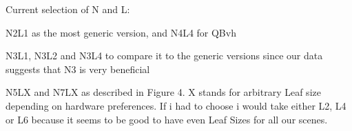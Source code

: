 \documentclass[12pt, a4paper]{report}
\newcommand{\branchf}{Branching Factor}
\newcommand{\leafs}{Leaf Size}
\newcommand{\leafi}{Leaf Intersection}
\newcommand{\nodei}{Node Intersection}
\newcommand{\sleafi}{Shadow Leaf Intersection}
\newcommand{\snodei}{Shadow Node Intersection}
\newcommand{\cost}{Cost Function}
\newcommand{\scost}{Shadow Cost Function}
\newcommand{\sah}{Sah}
\newcommand{\epo}{Epo}
\newcommand{\plotAll} [2]
{
\begin{figure}[!htb]
	\begin{minipage}[t]{0.4\textwidth} 
		\begin{tikzpicture}
		\begin{axis}
		[
		xlabel = \leafs,
		ylabel = \branchf,
		colorbar style={title=\leafi}
		]
		\addplot[matrix plot*,point meta=\thisrow{primaryLeafIntersections}]
		table[x = leafSize, y = branchFactor, col sep=comma]{#1};
		\end{axis}
		\end{tikzpicture}
	\end{minipage}\hfil \hfil
	\begin{minipage}[t]{0.4\textwidth}
		\begin{tikzpicture}
		\begin{axis}
		[
		xlabel = \leafs,
		colorbar style={title=\nodei}
		]
		\addplot[matrix plot*,point meta=\thisrow{primaryNodeIntersections}]
		table[x = leafSize, y = branchFactor, col sep=comma]{#1};
		\end{axis}
		\end{tikzpicture}
	\end{minipage}
	
	\begin{minipage}[t]{0.4\textwidth} 
		\begin{tikzpicture}
		\begin{axis}
		[
		xlabel = \leafs,
		ylabel = \branchf,
		colorbar style={title=\sleafi}
		]
		\addplot[matrix plot*,point meta=\thisrow{secondaryLeafIntersections}]
		table[x = leafSize, y = branchFactor, col sep=comma]{#1};
		\end{axis}
		\end{tikzpicture}
	\end{minipage}\hfil \hfil
	\begin{minipage}[t]{0.4\textwidth}
		\begin{tikzpicture}
		\begin{axis}
		[
		xlabel = \leafs,
		colorbar style={title=\snodei}
		]
		\addplot[matrix plot*,point meta=\thisrow{secondaryNodeIntersections}]
		table[x = leafSize, y = branchFactor, col sep=comma]{#1};
		\end{axis}
		\end{tikzpicture}
	\end{minipage}
	
	\begin{minipage}[t]{0.4\textwidth}
		\begin{tikzpicture}
		\begin{axis}
		[
		xlabel = \leafs,
		ylabel = \branchf,
		colorbar style={title=\cost}
		]
		\addplot[matrix plot*,point meta=\thisrow{PrimaryCost}]
		table[x = leafSize, y = branchFactor, col sep=comma]{#1};
		\end{axis}
		\end{tikzpicture}
	\end{minipage}\hfil\hfil
	\begin{minipage}[t]{0.4\textwidth}
		
		\begin{tikzpicture}
		\begin{axis}
		[
		xlabel = \leafs,
		colorbar style={title=\scost}
		]
		\addplot[matrix plot*,point meta=\thisrow{SecondaryCost}]
		table[x = leafSize, y = branchFactor, col sep=comma]{#1};
		\end{axis}
		\end{tikzpicture}
	\end{minipage}

	\begin{minipage}[t]{0.4\textwidth}
		\begin{tikzpicture}
		\begin{axis}
		[
		xlabel = \leafs,
		ylabel = \branchf,
		colorbar style={title=\sah}
		]
		\addplot[matrix plot*,point meta=\thisrow{Sah}]
		table[x = leafSize, y = branchFactor, col sep=comma]{#1};
		\end{axis}
		\end{tikzpicture}
	\end{minipage}\hfil\hfil
	\begin{minipage}[t]{0.4\textwidth}
		\begin{tikzpicture}
		\begin{axis}
		[
		xlabel = \leafs,
		colorbar style={title=\epo}
		]
		\addplot[matrix plot*,point meta=\thisrow{Epo}]
		table[x = leafSize, y = branchFactor, col sep=comma]{#1};
		\end{axis}
		\end{tikzpicture}
	\end{minipage}
	\caption{#2}
\end{figure}
}
\begin{document}


\newpage
\newpage
\newpage

Current selection of N and L:

N2L1 as the most generic version, and N4L4 for QBvh

N3L1, N3L2 and N3L4 to compare it to the generic versions since our data suggests that N3 is very beneficial

N5LX and N7LX as described in Figure 4. X stands for arbitrary Leaf size depending on hardware preferences. If i had to choose i would take either L2, L4 or L6 because it seems to be good to have even Leaf Sizes for all our scenes.


\iffalse
\plotAll{Data/shiftHappensTableWithSpaceSorted.txt}{Shift happens \url{https://sketchfab.com/3d-models/shift-happens-canyon-diorama-ffd36dfbfda8432d97388988883f6295}. Low poly scene. 53,857 Vertices and 240,865 Triangles. Sorted}
\newpage

\plotAll{Data/sponzaTableWithSpaceSorted.txt}{Sponza \url{http://casual-effects.com/data/index.html}. Interior scene. 192,676 Vertices and 262,267 Triangles. Sorted}
\newpage

\plotAll{Data/rungholtTableWithSpaceSorted.txt}{Rungholt \url{http://casual-effects.com/data/index.html}. Large minecraft city. 11,630,990 Vertices and 5,815,444 Triangles. Sorted}
\newpage

\plotAll{Data/eratoTableWithSpaceSorted.txt}{Eratio \url{http://casual-effects.com/data/index.html}. Scan of a marble statue. 235,332 Vertices and 412,669 Triangles. Sorted}
\newpage

\plotAll{Data/AverageTableWithSpaceSorted.txt}{Average of all normalized results. Sorted}
\newpage
\fi
\end{document}
